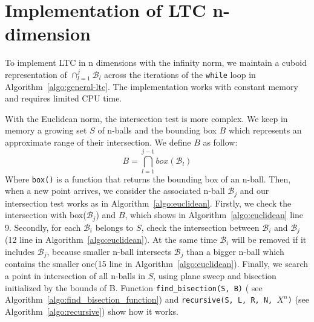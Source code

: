 \section{Implementation of LTC n-dimension}

To implement LTC in n dimensions with the infinity norm, we maintain a cuboid
representation of $\cap_{l=1}^j{\mathcal{B}_l}$ across the
iterations of the \texttt{while} loop in
Algorithm~\ref{algo:general-ltc}. The implementation works with
constant memory and requires limited CPU time.

With the Euclidean norm, the intersection test is more complex. We keep in
memory a growing set $S$ of n-balls and the bounding box $B$ which represents an approximate range of their intersection. We define $B$ as follow:
\begin{equation*}
    B = \bigcap_{l=1}^{j-1} box(\mathcal{B}_l) 
\end{equation*}
Where \texttt{box()} is a function that returns the
bounding box of an n-ball.
Then, when a new point arrives, we consider the associated n-ball
$\mathcal{B}_j$ and our intersection test works as in
Algorithm~\ref{algo:euclidean}. 
Firstly, we check the intersection with box($\mathcal{B}_j$) and $B$, which
shows in Algorithm~\ref{algo:euclidean} line 9.
Secondly, for each
$\mathcal{B}_i$ belongs to $S$, check the intersection between $\mathcal{B}_i$
and $\mathcal{B}_j$ (12 line in Algorithm~\ref{algo:euclidean}). At the same
time $\mathcal{B}_i$ will be removed if it includes $\mathcal{B}_j$, because
smaller n-ball intersects $\mathcal{B}_j$ than a bigger n-ball which contains the
smaller one(15 line in Algorithm~\ref{algo:euclidean}). 
Finally, we search a point
in intersection of all n-balls in $S$, using plane sweep and bisection
initialized by the bounds of B. Function \texttt{find\_bisection(S,
B)} (
see Algorithm~\ref{algo:find_bisection_function}) and \texttt{recursive(S, L, R, N, $X^n$)} (see Algorithm~\ref{algo:recursive}) show how it works.  


